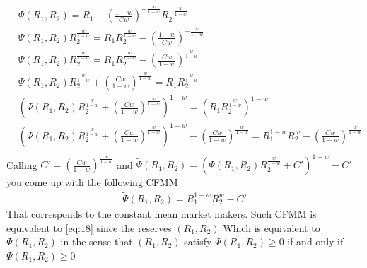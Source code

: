 \documentclass[12pt]{article}
\begin{document}
\begin{align*}
     & \Psi(R_1,R_2)                    = R_1 -\left(\frac{1-w}{Cw}\right)^{-\frac{w}{1-w}} R_2^{-\frac{w}{1-w}}                                                                                                                             \\
     & \Psi(R_1,R_2)R_2^{\frac{w}{1-w}} = R_1R_2^{\frac{w}{1-w}} -\left(\frac{1-w}{Cw}\right)^{-\frac{w}{1-w}}                                                                                                                               \\
     & \Psi(R_1,R_2)R_2^{\frac{w}{1-w}} = R_1R_2^{\frac{w}{1-w}} -\left(\frac{Cw}{1-w}\right)^{\frac{w}{1-w}}                                                                                                                                \\
     & \Psi(R_1,R_2)R_2^{\frac{w}{1-w}} +\left(\frac{Cw}{1-w}\right)^{\frac{w}{1-w}} = R_1R_2^{\frac{w}{1-w}}                                                                                                                                \\
     & \left(\Psi(R_1,R_2)R_2^{\frac{w}{1-w}} +\left(\frac{Cw}{1-w}\right)^{\frac{w}{1-w}}\right)^{1-w} = \left(R_1R_2^{\frac{w}{1-w}}\right)^{1-w}                                                                                          \\
     & \left(\Psi(R_1,R_2)R_2^{\frac{w}{1-w}} +\left(\frac{Cw}{1-w}\right)^{\frac{w}{1-w}}\right)^{1-w} - \left(\frac{Cw}{1-w}\right)^{\frac{w}{1-w}}= R_1^{1-w}R_2^w                          - \left(\frac{Cw}{1-w}\right)^{\frac{w}{1-w}} \\
\end{align*}
Calling $C'=\left(\frac{Cw}{1-w}\right)^{\frac{w}{1-w}}$ and \newline  $ \tilde{\Psi}(R_1,R_2)= \left(\Psi(R_1,R_2)R_2^{\frac{w}{1-w}} +C'\right)^{1-w} - C'$ \newline you come up with the following CFMM
\begin{align*}
    \tilde{\Psi}(R_1,R_2) = R_1^{1-w}R_2^w - C'
\end{align*}
That corresponds to the constant mean market makers. Such CFMM is equivalent to \eqref{eq:18} since the reserves $(R_1,R_2)$
Which is equivalent to $\Psi(R_1,R_2)$ in the sense that $(R_1,R_2)$ satisfy $\Psi(R_1,R_2)\geq 0$ if and only if $\tilde{\Psi}(R_1,R_2)\geq 0$
\end{document}

